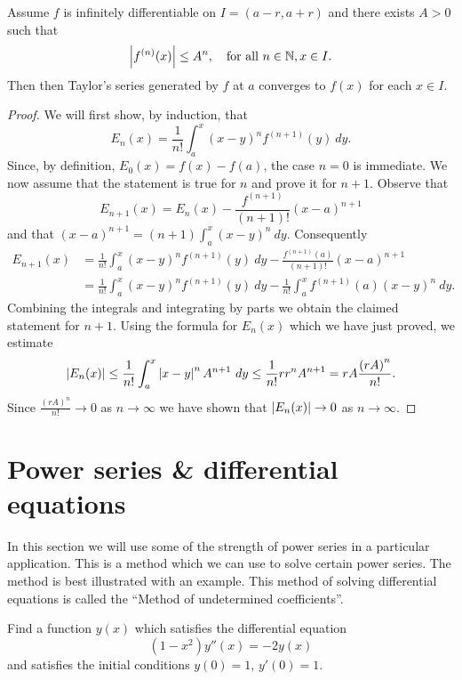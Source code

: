 \begin{theorem}
  Assume \(f\) is infinitely differentiable on \(I=(a-r,a+r)\) and there exists \(A>0\) such that
  \[
    \left|f^{(n)}(x)\right|\leq A^n, \quad \text{for all \(n\in \mathbb{N}, x\in I\)}.
  \]
  Then then Taylor's series generated by \(f\) at \(a\) converges to \(f(x)\) for each \(x\in I\).
\end{theorem}

\begin{proof}
  We will first show, by induction, that
  \[
    E_n(x) = \frac{1}{n!} \int_{a}^{x} {(x-y)}^n f^{(n+1)}(y) \ dy.
  \]
  Since, by definition, \(E_0(x) = f(x) - f(a) \), the case \(n=0\) is immediate.
  We now assume that the statement is true for \(n\) and prove it for \(n+1\).
  Observe that
  \[
    E_{n+1}(x) = E_{n}(x) -   \frac{f^{(n+1)}}{(n+1)!}{(x-a)}^{n+1}
  \]
and that \({(x-a)}^{n+1} = (n+1) \int_{a}^{x}{(x-y)}^n \ dy\).
  Consequently
  \[
    \begin{aligned}
      E_{n+1}(x) 
      &= 
      \frac{1}{n!} \int_{a}^{x} {(x-y)}^n f^{(n+1)}(y) \ dy
      -   \frac{f^{(n+1)}(a)}{(n+1)!}{(x-a)}^{n+1}\\
       &= 
       \frac{1}{n!} \int_{a}^{x} {(x-y)}^n f^{(n+1)}(y) \ dy
       - \frac{1}{n!}  \int_{a}^{x} f^{(n+1)}(a)  {(x-y)}^n \ dy.
    \end{aligned}
  \]
  Combining the integrals and integrating by parts we obtain the claimed statement for \(n+1\).
  Using the formula for \(E_n(x)\) which we have just proved, we estimate
  \[
    \left|E_n(x)\right|
    \leq \frac{1}{n!} \int_{a}^{x} \left|x-y\right|^n A^{n+1}  \ dy
    \leq \frac{1}{n!} r r^n  A^{n+1} = rA \frac{{(rA)}^n}{n!}.
  \]
  Since \(\frac{{(rA)}^n}{n!} \to 0\) as \(n\to \infty\) we have shown that \(\left|E_n(x)\right|  \to 0\) as \(n\to \infty\).
\end{proof}



\section{Power series \& differential equations}

In this section we will use some of the strength of power series in a particular application. This is a method which we can use to solve certain power series. The method is best illustrated with an example.
This method of solving differential equations is called the ``Method of undetermined coefficients''.

\begin{task}
  Find a function \(y(x)\) which satisfies the differential equation
  \[
    (1-x^2)y''(x) = -2y(x)
  \]
  and satisfies the initial conditions \(y(0)=1\), \(y'(0)=1\).
\end{task}

